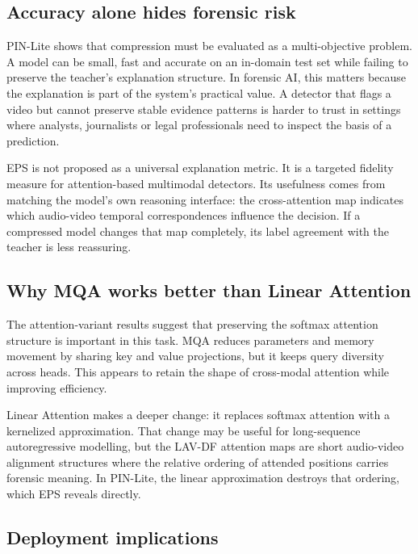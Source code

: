 \documentclass[pdflatex,sn-basic,Numbered]{sn-jnl}
\begin{document}
\subsection{Accuracy alone hides forensic risk}\label{subsec:accuracy-risk}

PIN-Lite shows that compression must be evaluated as a multi-objective problem. A model can be small, fast and accurate on an in-domain test set while failing to preserve the teacher's explanation structure. In forensic AI, this matters because the explanation is part of the system's practical value. A detector that flags a video but cannot preserve stable evidence patterns is harder to trust in settings where analysts, journalists or legal professionals need to inspect the basis of a prediction.

EPS is not proposed as a universal explanation metric. It is a targeted fidelity measure for attention-based multimodal detectors. Its usefulness comes from matching the model's own reasoning interface: the cross-attention map indicates which audio-video temporal correspondences influence the decision. If a compressed model changes that map completely, its label agreement with the teacher is less reassuring.

\subsection{Why MQA works better than Linear Attention}\label{subsec:mqa}

The attention-variant results suggest that preserving the softmax attention structure is important in this task. MQA reduces parameters and memory movement by sharing key and value projections, but it keeps query diversity across heads. This appears to retain the shape of cross-modal attention while improving efficiency.

Linear Attention makes a deeper change: it replaces softmax attention with a kernelized approximation. That change may be useful for long-sequence autoregressive modelling, but the LAV-DF attention maps are short audio-video alignment structures where the relative ordering of attended positions carries forensic meaning. In PIN-Lite, the linear approximation destroys that ordering, which EPS reveals directly.

\subsection{Deployment implications}\label{subsec:deployment}
\end{document}
